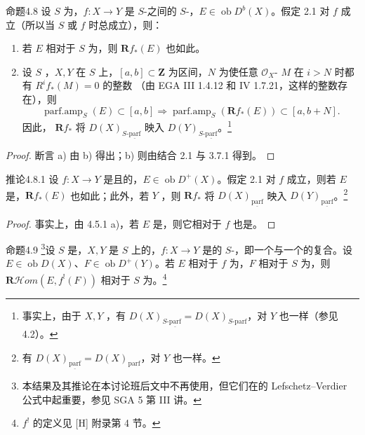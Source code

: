\begin{SGAresult}{命题}{4.8}
设 $S$ 为，$f:X\to Y$ 是 $S$-之间的 $S$-，$E\in\operatorname{ob}D^b(X)$。假定 2.1 对 $f$ 成立（所以当 $S$ 或 $f$ 时总成立），则：
\begin{enumerate}
\item[a)] 若 $E$ 相对于 $S$ 为，则 $\mathbf Rf_*(E)$ 也如此。
\item[b)] 设 $S$ ，$X,Y$ 在 $S$ 上，$[a,b]\subset\mathbf Z$ 为区间，$N$ 为使任意 $\mathcal O_X$- $M$ 在 $i>N$ 时都有 $R^if_*(M)=0$ 的整数
（由 EGA III 1.4.12 和 IV 1.7.21，这样的整数存在），则
\[
\operatorname{parf.amp}_S(E)\subset[a,b]\Longrightarrow
\operatorname{parf.amp}_S(\mathbf Rf_*(E))\subset[a,b+N].
\]
因此， $\mathbf Rf_*$ 将 $D(X)_{S\text{-}\underline{\mathrm{parf}}}$ 映入 $D(Y)_{S\text{-}\underline{\mathrm{parf}}}$。\footnote{事实上，由于 $X,Y$ ，有 $D(X)_{S\text{-}\underline{\mathrm{parf}}}=D(X)_{S\text{-}\mathrm{parf}}$，对 $Y$ 也一样（参见 4.2）。}
\end{enumerate}
\end{SGAresult}
\begin{proof}断言 a) 由 b) 得出；b) 则由结合 2.1 与 3.7.1 得到。
\end{proof}
\begin{SGAresult}{推论}{4.8.1}
设 $f:X\to Y$ 是且的，$E\in\operatorname{ob}D^+(X)$。假定 2.1 对 $f$ 成立，则若 $E$ 是，$\mathbf Rf_*(E)$ 也如此；此外，若 $Y$ ，则 $\mathbf Rf_*$ 将 $D(X)_{\underline{\mathrm{parf}}}$ 映入 $D(Y)_{\underline{\mathrm{parf}}}$。\footnote{有 $D(X)_{\underline{\mathrm{parf}}}=D(X)_{\mathrm{parf}}$，对 $Y$ 也一样。}
\end{SGAresult}
\begin{proof}事实上，由 4.5.1 a)，若 $E$ 是，则它相对于 $f$ 也是。
\end{proof}
\begin{SGAresult}{命题}{4.9}
\footnote{本结果及其推论在本讨论班后文中不再使用，但它们在的 Lefschetz--Verdier 公式中起重要，参见 SGA 5 第 III 讲。}设 $S$ 是，$X,Y$ 是 $S$ 上的，$f:X\to Y$ 是的 $S$-，即一个与一个的复合。设 $E\in\operatorname{ob}D(X)$、$F\in\operatorname{ob}D^+(Y)$。若 $E$ 相对于 $f$ 为，$F$ 相对于 $S$ 为，则 $\mathbf R\mathcal Hom(E,f^!(F))$ 相对于 $S$ 为。\footnote{ $f^!$ 的定义见 [H] 附录第 4 节。}
\end{SGAresult}
